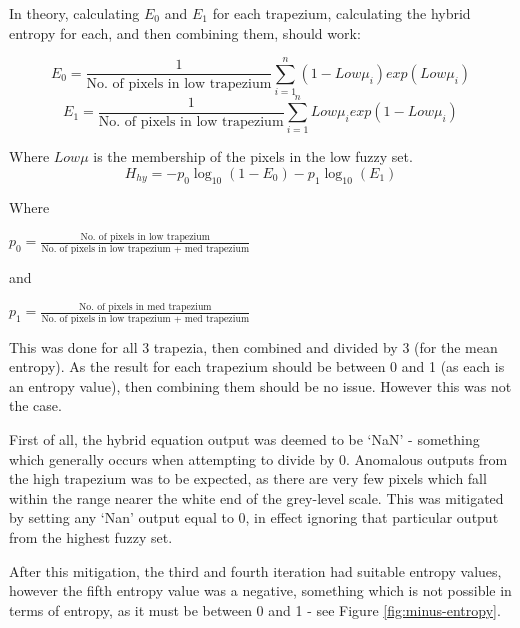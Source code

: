 In theory, calculating $E_0$ and $E_1$ for each trapezium, calculating the hybrid entropy for each, and then combining them, should work:

\begin{equation}
E_0 = \frac{1}{\text{No. of pixels in low trapezium}}\displaystyle\sum_{i=1}^{n}{(1-Low\mu_i)exp(Low\mu_i)}
\end{equation}
\begin{equation}
E_1 = \frac{1}{\text{No. of pixels in low trapezium}}\displaystyle\sum_{i=1}^{n}{Low\mu_iexp(1-Low\mu_i)}
\end{equation}

Where $Low\mu$ is the membership of the pixels in the low fuzzy set.
\begin{equation}
H_{hy} = -p_0\log_{10}(1 - E_0) - p_1\log_{10}(E_1)
\end{equation}

Where

$p_0 = \frac{\text{No. of pixels in low trapezium}}{\text{No. of pixels in low trapezium + med trapezium}}$

and

$p_1 = \frac{\text{No. of pixels in med trapezium}}{\text{No. of pixels in low trapezium + med trapezium}}$


This was done for all 3 trapezia, then combined and divided by 3 (for the mean entropy). As the result for each trapezium should be between 0 and 1 (as each is an entropy value), then combining them should be no issue. However this was not the case.

First of all, the hybrid equation output was deemed to be `NaN' - something which generally occurs when attempting to divide by 0. Anomalous outputs from the high trapezium was to be expected, as there are very few pixels which fall within the range nearer the white end of the grey-level scale. This was mitigated by setting any `Nan' output equal to 0, in effect ignoring that particular output from the highest fuzzy set.

After this mitigation, the third and fourth iteration had suitable entropy values, however the fifth entropy value was a negative, something which is not possible in terms of entropy, as it must be between 0 and 1 - see Figure \ref{fig:minus-entropy}.

